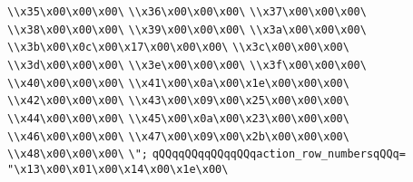 \verb|\\x35\x00\x00\x00\|\newline
\verb|\\x36\x00\x00\x00\|\newline
\verb|\\x37\x00\x00\x00\|\newline
\verb|\\x38\x00\x00\x00\|\newline
\verb|\\x39\x00\x00\x00\|\newline
\verb|\\x3a\x00\x00\x00\|\newline
\verb|\\x3b\x00\x0c\x00\x17\x00\x00\x00\|\newline
\verb|\\x3c\x00\x00\x00\|\newline
\verb|\\x3d\x00\x00\x00\|\newline
\verb|\\x3e\x00\x00\x00\|\newline
\verb|\\x3f\x00\x00\x00\|\newline
\verb|\\x40\x00\x00\x00\|\newline
\verb|\\x41\x00\x0a\x00\x1e\x00\x00\x00\|\newline
\verb|\\x42\x00\x00\x00\|\newline
\verb|\\x43\x00\x09\x00\x25\x00\x00\x00\|\newline
\verb|\\x44\x00\x00\x00\|\newline
\verb|\\x45\x00\x0a\x00\x23\x00\x00\x00\|\newline
\verb|\\x46\x00\x00\x00\|\newline
\verb|\\x47\x00\x09\x00\x2b\x00\x00\x00\|\newline
\verb|\\x48\x00\x00\x00\|\newline
\verb|\";|\newline
\verb|qQQqqQQqqQQqqQQqaction_row_numbersqQQq=|\newline
\verb|"\x13\x00\x01\x00\x14\x00\x1e\x00\|\newline
